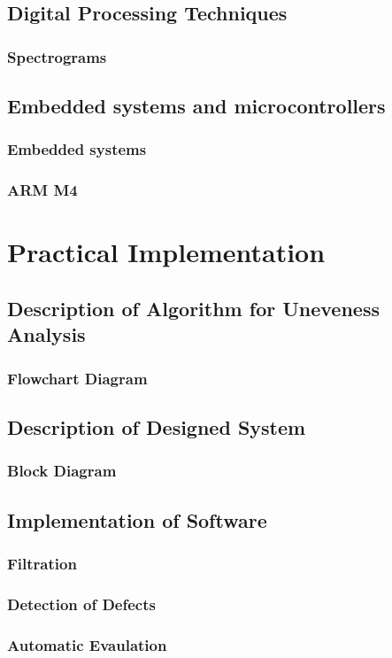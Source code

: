\documentclass[twoside]{ctuthesis}
\theoremstyle{plain}
\theoremstyle{definition}
\theoremstyle{note}
\begin{document}
\section{Digital Processing Techniques}
\subsection{Spectrograms}
\section{Embedded systems and microcontrollers}
\subsection{Embedded systems}
\subsection{ARM M4}

\chapter{Practical Implementation}
\section{Description of Algorithm for Uneveness Analysis}
\subsection{Flowchart Diagram}
\section{Description of Designed System}
\subsection{Block Diagram}
\section{Implementation of Software}
\subsection{Filtration}
\subsection{Detection of Defects}
\subsection{Automatic Evaulation}
\end{document}
